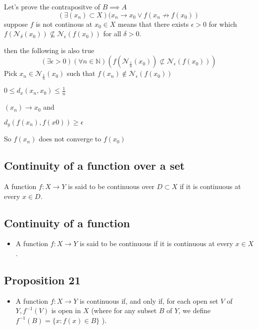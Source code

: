 \documentclass[12pt,a4paper]{article}
\begin{document}
\begin{tcolorbox}
    Let's prove the contrapositve of \(B \implies A\)  
    \begin{equation*}
        \left( \exists (x_{n}) \subset X \right)(x_{n} \to x_{0} \vee f(x_{n} \not\longrightarrow f(x_{0}))  
    \end{equation*}    
    suppose \(f\) is not continous at \(x_{0} \in X\)  means that there exists \(\epsilon>0\) for which \(f\left(\mathcal{N}_\delta\left(x_0\right)\right) \nsubseteq \mathcal{N}_\epsilon\left(f\left(x_0\right)\right)\) for all \(\delta>0\). 

    then the following is also true 
    \begin{equation*}
        (\exists \epsilon > 0)(\forall n \in \mathbb{N})(f(\mathcal{N}_{\frac{1}{n}}(x_{0})) \not\subset \mathcal{N}_{\epsilon}(f(x_{0})))
    \end{equation*}    
    Pick \(x_{n} \in \mathcal{N}_{\frac{1}{n}}(x_{0})\) such that \(f(x_{n}) \notin \mathcal{N}_{\epsilon}(f(x_{0}))\)
    
    \(0 \leq d_{x}(x_{n},x_{0}) \leq \frac{1}{n}\)
    
    \((x_{n}) \to x_{0}\) and
    
    \( d_y(f(x_n),f(x0)) \geq \epsilon\)
    
    So \(f(x_{n})\) does not converge to \(f(x_{0})\)    
\end{tcolorbox}
\subsection{Continuity of a function over a set}
\begin{tcolorbox}
A function \(f: X \rightarrow Y\) is said to be continuous over \(D \subset X\)   if it is continuous at every \(x \in D\).
\end{tcolorbox}

\subsection{Continuity of a function}
\begin{itemize}
    \item A function \(f: X \rightarrow Y\) is said to be continuous if it is continuous at every \(x \in X\).
\end{itemize}
\subsection{Proposition 21}
\begin{itemize}
    \item A function \(f: X \rightarrow Y\) is continuous if, and only if, for each open set \(V\) of \(Y, f^{-1}(V)\) is open in \(X\) (where for any subset \(B\) of \(Y\), we define \(f^{-1}(B)=\{x: f(x) \in B\}\) ).
\end{itemize}
\end{document}
